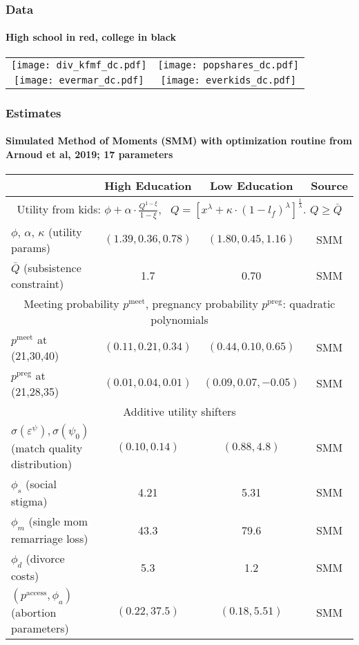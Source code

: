 \documentclass[aspectratio=169]{beamer}
\begin{document}
\begin{frame}
\frametitle{Data}
\framesubtitle{High school in red, college in black}
\begin{center}
\begin{tabular}{c c}
\hspace{-0.5cm} \texttt{[image: div\_kfmf\_dc.pdf]} & \texttt{[image: popshares\_dc.pdf]} \\
\hspace{-0.5cm} \texttt{[image: evermar\_dc.pdf]} & \texttt{[image: everkids\_dc.pdf]} \\
\end{tabular}
\end{center}
\end{frame}



\begin{frame}
\frametitle{Estimates}
\framesubtitle{Simulated Method of Moments (SMM) with optimization routine from Arnoud et al, 2019; 17 parameters}
\begin{tabular}{l c c c}\hline
& High Education & Low Education & Source \\\hline
\multicolumn{4}{c}{Utility from kids: $\phi + \alpha \cdot \frac{Q^{1-\xi}}{1-\xi}$, \ $Q = [x^{\lambda} + \kappa\cdot(1-l_f)^{\lambda}]^{\frac1{\lambda}}$. $Q\geq \bar{Q}$}\\\hline
$\phi$, $\alpha$, $\kappa$  \footnotesize (utility params) &\footnotesize  $(1.39, 0.36, 0.78)$ &\footnotesize $(1.80,0.45, 1.16)$ & SMM \\
$\bar{Q}$ \footnotesize (subsistence constraint) & 1.7 & 0.70 & SMM\\
\multicolumn{4}{c}{Meeting probability $p^{\text{meet}}$, pregnancy probability $p^{\text{preg}}$: quadratic polynomials}\\\hline
$p^{\text{meet}}$  \footnotesize at (21,30,40) & \footnotesize $(0.11, 0.21, 0.34)$ & \footnotesize  $(0.44, 0.10, 0.65)$ & SMM\\
$p^{\text{preg}}$ \footnotesize  at (21,28,35) & \footnotesize  $(0.01, 0.04, 0.01)$ & \footnotesize  $(0.09, 0.07, -0.05)$ & SMM \\\hline\hline
\multicolumn{4}{c}{Additive utility shifters}\\\hline
$\sigma(\varepsilon^\psi), \sigma(\psi_0)$   \footnotesize (match quality distribution) & $(0.10,0.14)$ & $(0.88,4.8)$ & SMM \\
$\phi_s$ \footnotesize  (social stigma) & 4.21 & 5.31 & SMM\\
$\phi_m$ \footnotesize   (single mom remarriage loss) & 43.3 & 79.6 & SMM \\\hline
$\phi_d$ \footnotesize   (divorce costs) & 5.3 & 1.2 & SMM \\\hline
$(p^{\text{access}}, \phi_a)$ \footnotesize   (abortion parameters) & $(0.22,37.5)$  & $(0.18,5.51) $& SMM \\\hline
\end{tabular}
\end{frame}
\end{document}
